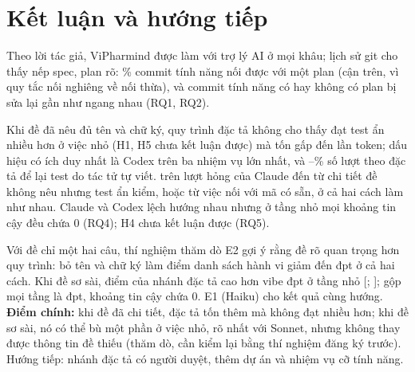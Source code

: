 \section{Kết luận và hướng tiếp}\label{sec:conclusion}

Theo lời tác giả, ViPharmind được làm với trợ lý AI ở mọi khâu; lịch sử git cho thấy nếp spec, plan rõ:
\NumFeatWithPlanPct{}\% commit tính năng nối được với một plan (cận trên, vì quy tắc nối nghiêng về nối
thừa), và commit tính năng có hay không có plan bị sửa lại gần như ngang nhau (RQ1, RQ2).

Khi đề đã nêu đủ tên và chữ ký, quy trình đặc tả không cho thấy đạt test ẩn nhiều hơn ở việc nhỏ (H1, H5
chưa kết luận được) mà tốn gấp \NumResTokenRatioMin{} đến \NumResTokenRatioMax{} lần token; dấu hiệu có ích duy nhất là Codex trên ba nhiệm vụ lớn nhất, và
\NumResSonnetSpecTestsAnyPct{}--\NumResCodexSpecTestsAnyPct{}\% số lượt theo đặc tả để lại test do tác tử tự viết. \NumLabOutside{} trên \NumLabRuns{} lượt
hỏng của Claude đến từ chi tiết đề không nêu nhưng test ẩn kiểm, hoặc từ việc nối với mã có sẵn, ở cả hai
cách làm như nhau. Claude và Codex lệch hướng nhau nhưng ở tầng nhỏ mọi khoảng tin cậy đều chứa 0 (RQ4); H4 chưa kết luận
được (RQ5).

Với đề chỉ một hai câu, thí nghiệm thăm dò E2 gợi ý rằng đề rõ quan trọng hơn quy trình: bỏ tên và chữ
ký làm điểm danh sách hành vi giảm \NumETwoXScoreShiftSpec{} đến \NumETwoXScoreShiftVibe{} đpt ở cả hai
cách. Khi đề sơ sài, điểm của nhánh đặc tả cao hơn vibe \NumETwoPooledSmallPp{}
đpt ở tầng nhỏ [\NumETwoPooledSmallLowPp{}; \NumETwoPooledSmallHighPp{}]; gộp mọi tầng
là \NumETwoPooledAllPp{} đpt, khoảng tin cậy chứa 0. E1 (Haiku) cho kết quả cùng hướng. \textbf{Điểm chính:} khi đề đã chi tiết, đặc tả
tốn thêm mà không đạt nhiều hơn; khi đề sơ sài, nó có thể bù một phần ở việc nhỏ,
rõ nhất với Sonnet, nhưng không thay được thông tin đề thiếu (thăm dò, cần kiểm lại bằng thí nghiệm đăng
ký trước). Hướng tiếp: nhánh đặc tả có người duyệt, thêm dự án và nhiệm vụ cỡ tính năng.
